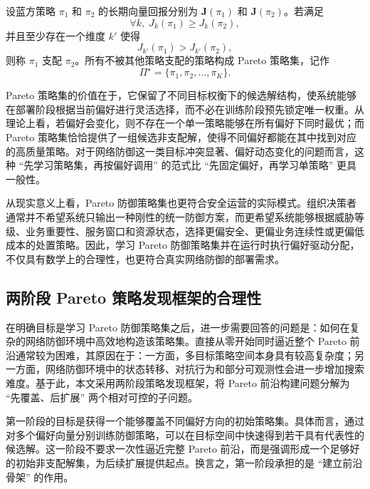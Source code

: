 \documentclass[12pt,a4paper]{article}
\begin{document}
设蓝方策略 $\pi_1$ 和 $\pi_2$ 的长期向量回报分别为 $\mathbf{J}(\pi_1)$ 和 $\mathbf{J}(\pi_2)$。若满足
\begin{equation}
\forall k,\; J_k(\pi_1) \ge J_k(\pi_2),
\end{equation}
并且至少存在一个维度 $k'$ 使得
\begin{equation}
J_{k'}(\pi_1) > J_{k'}(\pi_2),
\end{equation}
则称 $\pi_1$ 支配 $\pi_2$。所有不被其他策略支配的策略构成 Pareto 策略集，记作
\begin{equation}
\Pi^{\star} = \{\pi_1,\pi_2,\dots,\pi_K\}.
\end{equation}

Pareto 策略集的价值在于，它保留了不同目标权衡下的候选解结构，使系统能够在部署阶段根据当前偏好进行灵活选择，而不必在训练阶段预先锁定唯一权重。从理论上看，若偏好会变化，则不存在一个单一策略能够在所有偏好下同时最优；而 Pareto 策略集恰恰提供了一组候选非支配解，使得不同偏好都能在其中找到对应的高质量策略。对于网络防御这一类目标冲突显著、偏好动态变化的问题而言，这种 ``先学习策略集，再按偏好调用'' 的范式比 ``先固定偏好，再学习单策略'' 更具一般性。

从现实意义上看，Pareto 防御策略集也更符合安全运营的实际模式。组织决策者通常并不希望系统只输出一种刚性的统一防御方案，而更希望系统能够根据威胁等级、业务重要性、服务窗口和资源状态，选择更偏安全、更偏业务连续性或更偏低成本的处置策略。因此，学习 Pareto 防御策略集并在运行时执行偏好驱动分配，不仅具有数学上的合理性，也更符合真实网络防御的部署需求。

\subsection{两阶段 Pareto 策略发现框架的合理性}

在明确目标是学习 Pareto 防御策略集之后，进一步需要回答的问题是：如何在复杂的网络防御环境中高效地构造该策略集。直接从零开始同时逼近整个 Pareto 前沿通常较为困难，其原因在于：一方面，多目标策略空间本身具有较高复杂度；另一方面，网络防御环境中的状态转移、对抗行为和部分可观测性会进一步增加搜索难度。基于此，本文采用两阶段策略发现框架，将 Pareto 前沿构建问题分解为 ``先覆盖、后扩展'' 两个相对可控的子问题。

第一阶段的目标是获得一个能够覆盖不同偏好方向的初始策略集。具体而言，通过对多个偏好向量分别训练防御策略，可以在目标空间中快速得到若干具有代表性的候选解。这一阶段不要求一次性逼近完整 Pareto 前沿，而是强调形成一个足够好的初始非支配解集，为后续扩展提供起点。换言之，第一阶段承担的是 ``建立前沿骨架'' 的作用。
\end{document}

